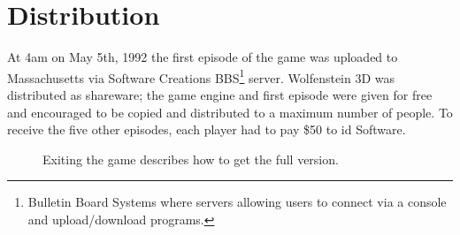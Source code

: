 \documentclass[book.tex]{subfiles}
\begin{document}
\section{Distribution}
At 4am on May 5th, 1992 the first episode of the game was uploaded to Massachusetts via Software Creations BBS\footnote{Bulletin Board Systems where servers allowing users to connect via a console and upload/download programs.} server. Wolfenstein 3D was distributed as shareware; the game engine and first episode were given for free and encouraged to be copied and distributed to a maximum number of people. To receive the five other episodes, each player had to pay \$50 to id Software.\\
\par
\begin{figure}[H]
\centering
 \caption{Exiting the game describes how to get the full version.}
 \end{figure}
\end{document}
